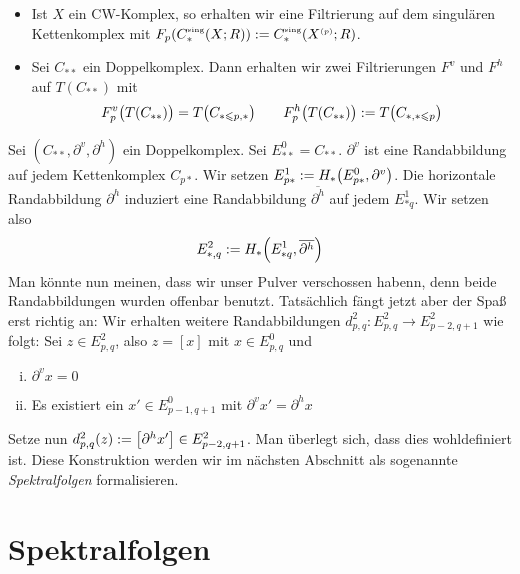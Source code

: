 \begin{beispiel}[{name=[Filtrierungen]},label=bsp:filtrierungen_total]
	\leavevmode
	\begin{itemize}
		\item Ist $X$ ein CW-Komplex, so erhalten wir eine Filtrierung auf dem singulären Kettenkomplex mit $F_p \enbrace*{C^\sing_*(X;R)} := C_*^\sing \enbrace*{X^\ssbrace{p};R}$.
		\item Sei $C_{**}$ ein Doppelkomplex. 
		Dann erhalten wir zwei Filtrierungen $F^v$ und $F^h$ auf $T(C_{**})$ mit
		\[
			F^v_p \enbrace[\big]{T(C_{**})} = T \enbrace[\big]{C_{*\le p,*}} \qquad F^h_p \enbrace[\big]{T(C_{**})} := T \enbrace[\big]{C_{*,*\le p}}
		\]
	\end{itemize}
\end{beispiel}

\begin{bemerkung}[{name=[{Konstruktion weiterer Komplexe aus einem Doppelkomplex}]},label=bem:konst_seiten_doppelkomplex]
	Sei $(C_{**},\partial^v,\partial^h)$ ein Doppelkomplex.
	Sei $E^0_{**}= C_{**}$.
	$\partial^v$ ist eine Randabbildung auf jedem Kettenkomplex $C_{p*}$.
	Wir setzen $E^1_{p*} := H_*\enbrace*{E^0_{p*},\partial^v}$.
	Die horizontale Randabbildung $\partial^h$ induziert eine Randabbildung $\overline{\partial^h}$ auf jedem $E^1_{*q}$. Wir setzen also
	\[
		E^2_{*,q} := H_* \enbrace*{E^1_{*q},\overline{\partial^h}}
	\]
	Man könnte nun meinen, dass wir unser Pulver verschossen habenn, denn beide Randabbildungen wurden offenbar benutzt.
	Tatsächlich fängt jetzt aber der Spaß erst richtig an:
	Wir erhalten weitere Randabbildungen $d^2_{p,q} \colon E^2_{p,q} \to E^2_{p-2,q+1}$ wie folgt: Sei $z \in E^2_{p,q}$, also $z=[x]$ mit $x \in E^0_{p,q}$ und 
	\begin{enumerate}[(i),itemsep=0pt]
		\item $\partial^v x =0$
		\item Es existiert ein $x' \in E^0_{p-1,q+1}$ mit $\partial^v x' = \partial^h x$
	\end{enumerate}
	Setze nun $d^2_{p,q}(z) := \benbrace*{\partial^h x'} \in E^2_{p-2,q+1}$.
	Man überlegt sich, dass dies wohldefiniert ist.
	Diese Konstruktion werden wir im nächsten Abschnitt als sogenannte \emph{Spektralfolgen} formalisieren.
\end{bemerkung}
\newpage

\section{Spektralfolgen} %
\label{sec:14}

